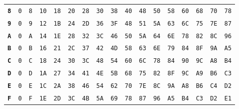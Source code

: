 \begin{tabular}{rrrrrrrrrrrrrrrrr}
\textbf{\texttt{8}} & \texttt{0} & \texttt{8} & \texttt{10} & \texttt{18} & \texttt{20} & \texttt{28} & \texttt{30} & \texttt{38} & \texttt{40} & \texttt{48} & \texttt{50} & \texttt{58} & \texttt{60} & \texttt{68} & \texttt{70} & \texttt{78}\\
\textbf{\texttt{9}} & \texttt{0} & \texttt{9} & \texttt{12} & \texttt{1B} & \texttt{24} & \texttt{2D} & \texttt{36} & \texttt{3F} & \texttt{48} & \texttt{51} & \texttt{5A} & \texttt{63} & \texttt{6C} & \texttt{75} & \texttt{7E} & \texttt{87}\\
\textbf{\texttt{A}} & \texttt{0} & \texttt{A} & \texttt{14} & \texttt{1E} & \texttt{28} & \texttt{32} & \texttt{3C} & \texttt{46} & \texttt{50} & \texttt{5A} & \texttt{64} & \texttt{6E} & \texttt{78} & \texttt{82} & \texttt{8C} & \texttt{96}\\
\textbf{\texttt{B}} & \texttt{0} & \texttt{B} & \texttt{16} & \texttt{21} & \texttt{2C} & \texttt{37} & \texttt{42} & \texttt{4D} & \texttt{58} & \texttt{63} & \texttt{6E} & \texttt{79} & \texttt{84} & \texttt{8F} & \texttt{9A} & \texttt{A5}\\
\textbf{\texttt{C}} & \texttt{0} & \texttt{C} & \texttt{18} & \texttt{24} & \texttt{30} & \texttt{3C} & \texttt{48} & \texttt{54} & \texttt{60} & \texttt{6C} & \texttt{78} & \texttt{84} & \texttt{90} & \texttt{9C} & \texttt{A8} & \texttt{B4}\\
\textbf{\texttt{D}} & \texttt{0} & \texttt{D} & \texttt{1A} & \texttt{27} & \texttt{34} & \texttt{41} & \texttt{4E} & \texttt{5B} & \texttt{68} & \texttt{75} & \texttt{82} & \texttt{8F} & \texttt{9C} & \texttt{A9} & \texttt{B6} & \texttt{C3}\\
\textbf{\texttt{E}} & \texttt{0} & \texttt{E} & \texttt{1C} & \texttt{2A} & \texttt{38} & \texttt{46} & \texttt{54} & \texttt{62} & \texttt{70} & \texttt{7E} & \texttt{8C} & \texttt{9A} & \texttt{A8} & \texttt{B6} & \texttt{C4} & \texttt{D2}\\
\textbf{\texttt{F}} & \texttt{0} & \texttt{F} & \texttt{1E} & \texttt{2D} & \texttt{3C} & \texttt{4B} & \texttt{5A} & \texttt{69} & \texttt{78} & \texttt{87} & \texttt{96} & \texttt{A5} & \texttt{B4} & \texttt{C3} & \texttt{D2} & \texttt{E1}\\
\bottomrule
\end{tabular}

